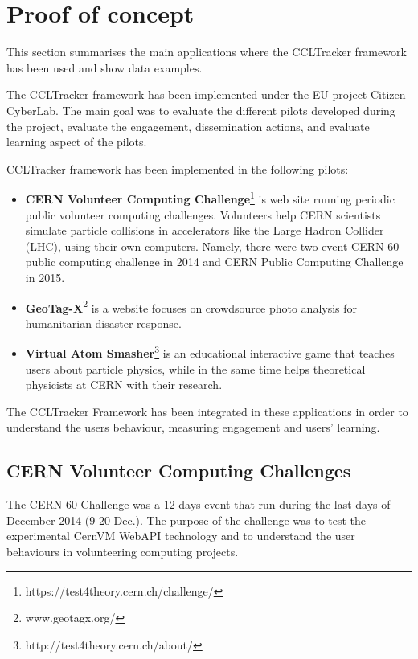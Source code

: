 \documentclass{article}
\begin{document}
\section{Proof of concept}

This section summarises the main applications where the CCLTracker framework has been used and show data examples. 

The CCLTracker framework has been implemented under the EU project Citizen CyberLab. The main goal was to evaluate the different pilots developed during the project, evaluate the engagement, dissemination actions, and evaluate learning aspect of the pilots.

CCLTracker framework has been implemented in the following pilots:

\begin{itemize}
\item \textbf{CERN Volunteer Computing Challenge}\footnote{https://test4theory.cern.ch/challenge/} is  web site running periodic public volunteer computing challenges. Volunteers help CERN scientists simulate particle collisions in accelerators like the Large Hadron Collider (LHC), using their own computers. Namely, there were two event CERN 60 public computing challenge in 2014 and CERN Public Computing Challenge in 2015. 

\item \textbf{GeoTag-X}\footnote{www.geotagx.org/} is a website focuses on crowdsource photo analysis for humanitarian disaster response.

\item \textbf{Virtual Atom Smasher}\footnote{http://test4theory.cern.ch/about/} is an educational interactive game that teaches users about particle physics, while in the same time helps theoretical physicists at CERN with their research.
\end{itemize}


The CCLTracker Framework has been integrated in these applications in order to understand the users behaviour, measuring engagement and users' learning. 


\subsection{CERN Volunteer Computing Challenges}

The CERN 60 Challenge was a 12-days event that run during the last days of December 2014 (9-20 Dec.). The purpose of the challenge was to test the experimental CernVM WebAPI technology and to understand the user behaviours in volunteering computing projects.
\end{document}

